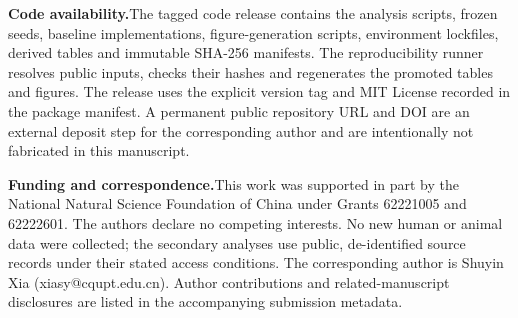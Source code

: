 \documentclass[10pt]{article}
\begin{document}
\textbf{Code availability.}\;The tagged code release contains the analysis scripts, frozen seeds, baseline implementations, figure-generation scripts, environment lockfiles, derived tables and immutable SHA-256 manifests. The reproducibility runner resolves public inputs, checks their hashes and regenerates the promoted tables and figures. The release uses the explicit version tag and MIT License recorded in the package manifest. A permanent public repository URL and DOI are an external deposit step for the corresponding author and are intentionally not fabricated in this manuscript.

\textbf{Funding and correspondence.}\;This work was supported in part by the National Natural Science Foundation of China under Grants 62221005 and 62222601. The authors declare no competing interests. No new human or animal data were collected; the secondary analyses use public, de-identified source records under their stated access conditions. The corresponding author is Shuyin Xia (xiasy@cqupt.edu.cn). Author contributions and related-manuscript disclosures are listed in the accompanying submission metadata.
\end{document}
